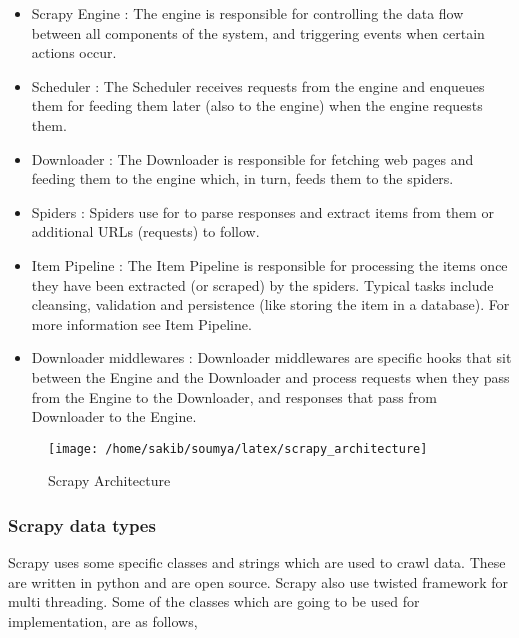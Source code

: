 \begin{itemize}
\item Scrapy Engine :
The engine is responsible for controlling the data flow between all components of the system, and triggering events when certain actions occur. 

\item Scheduler :
The Scheduler receives requests from the engine and enqueues them for feeding them later (also to the engine) when the engine requests them.

\item Downloader :
The Downloader is responsible for fetching web pages and feeding them to the engine which, in turn, feeds them to the spiders.

\item Spiders :
Spiders use for to parse responses and extract items from them or additional URLs (requests) to follow.

\item Item Pipeline :
The Item Pipeline is responsible for processing the items once they have been extracted (or scraped) by the spiders. Typical tasks include cleansing, validation and persistence (like storing the item in a database). For more information see Item Pipeline.

\item Downloader middlewares :
Downloader middlewares are specific hooks that sit between the Engine and the Downloader and process requests when they pass from the Engine to the Downloader, and responses that pass from Downloader to the Engine.

\end{itemize}

\begin{figure}[htb]
  \centering
  \texttt{[image: /home/sakib/soumya/latex/scrapy\_architecture]}\\
  \caption{Scrapy Architecture}
  \label{fig:scrapy}
\end{figure}

\subsubsection{Scrapy data types}
\noindent Scrapy uses some specific classes and strings which are used to crawl data. These are written in python and are open source. Scrapy also use twisted framework for multi threading. Some of the classes which are going to be used for implementation, are as follows,\\


